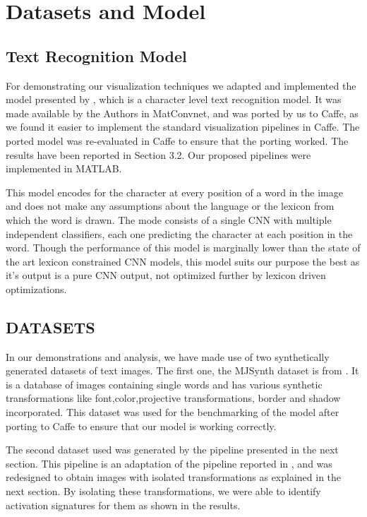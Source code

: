 \documentclass[10pt,twocolumn,letterpaper]{article}
\begin{document}
\section{Datasets and Model}

\subsection{Text Recognition Model}
For demonstrating our visualization techniques we adapted and implemented the model presented by \cite{Jaderberg14c}, which is a character level text recognition model. It was made available by the Authors in MatConvnet, and was ported by us to Caffe, as we found it easier to implement the standard visualization pipelines in Caffe. The ported model was re-evaluated in Caffe to ensure that the porting worked. The results have been reported in Section 3.2. Our proposed pipelines were implemented in MATLAB.

This  model encodes for the character at every position of a word in the image and does not make any assumptions about the language or the lexicon from which the word is drawn. The  mode consists of a single CNN with multiple independent classifiers, each one predicting the character at each position in the word. Though the performance of this model is marginally lower than the state of the art lexicon constrained CNN models, this model suits our purpose the best as it's output is a pure CNN output, not optimized further by lexicon driven optimizations.  

\subsection{DATASETS}
In our demonstrations and analysis, we have made use of two synthetically generated datasets of text images. The first one, the MJSynth dataset is from \cite{Jaderberg14c}. It is a database of images containing single words and has various synthetic transformations like font,color,projective transformations, border and shadow incorporated. This dataset was used for the benchmarking of the model after porting to Caffe to ensure that our model is working correctly. 

The second dataset used was generated by the pipeline presented in the next section. This pipeline is an adaptation of the pipeline reported in \cite{Gupta16}, and was redesigned to obtain images with isolated transformations as explained in the next section. By isolating these transformations, we were able to identify activation signatures for them as shown in the results. 
\end{document}
